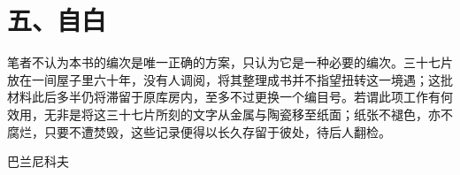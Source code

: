 \section*{五、自白}

笔者不认为本书的编次是唯一正确的方案，只认为它是一种必要的编次。三十七片放在一间屋子里六十年，没有人调阅，将其整理成书并不指望扭转这一境遇；这批材料此后多半仍将滞留于原库房内，至多不过更换一个编目号。若谓此项工作有何效用，无非是将这三十七片所刻的文字从金属与陶瓷移至纸面；纸张不褪色，亦不腐烂，只要不遭焚毁，这些记录便得以长久存留于彼处，待后人翻检。

\begin{flushright}
{\small 巴兰尼科夫}
\end{flushright}
